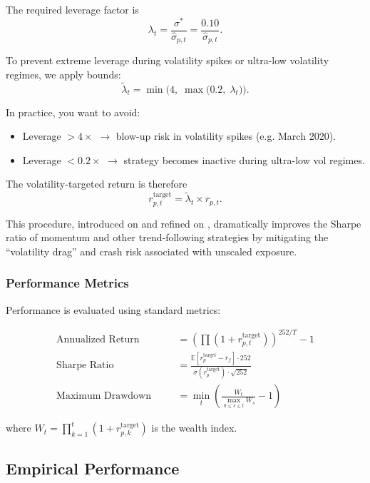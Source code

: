 \documentclass[12pt, a4paper]{article}
\begin{document}
	The required leverage factor is
	$$
	\lambda_t = \frac{\sigma^*}{\hat{\sigma}_{p,t}}
	= \frac{0.10}{\hat{\sigma}_{p,t}}.
	$$
	
	To prevent extreme leverage during volatility spikes or ultra-low volatility regimes, we apply bounds:
	$$
	\tilde{\lambda}_t 
	= \min\!\Big(4,\; \max\!\big(0.2,\; \lambda_t\big)\Big).
	$$
	
	In practice, you want to avoid:
	
	\begin{itemize}
		\item Leverage $> 4\times$ $\to$ blow-up risk in volatility spikes (e.g. March 2020).
		\item Leverage $< 0.2\times$ $\to$ strategy becomes inactive during ultra-low vol regimes.
	\end{itemize}
	
	The volatility-targeted return is therefore
	$$
	r_{p,t}^{\text{target}} = \tilde{\lambda}_t \times r_{p,t}.
	$$
	
	This procedure, introduced on \cite{barroso} and refined on \cite{moreira}, dramatically improves the Sharpe ratio of momentum and other trend-following strategies by mitigating the ``volatility drag'' and crash risk associated with unscaled exposure.
	
	\subsubsection{Performance Metrics}
	
	Performance is evaluated using standard metrics:
	
	\begin{align}
		\text{Annualized Return} &\quad &= \left( \prod (1 + r_{p,t}^{\text{target}}) \right)^{252/T} - 1 \\
		\text{Sharpe Ratio} &\quad &= \frac{\mathbb{E}[r_p^{\text{target}} - r_f] \cdot 252}{\sigma(r_p^{\text{target}}) \cdot \sqrt{252}} \\
		\text{Maximum Drawdown} &\quad &= \min_t \left( \frac{W_t}{ \max_{0 \leq s \leq t} W_s } - 1 \right)
	\end{align}
	
	where $W_t = \prod_{k=1}^t (1 + r_{p,k}^{\text{target}})$ is the wealth index.
	
	\subsection{Empirical Performance}
	
\end{document}
